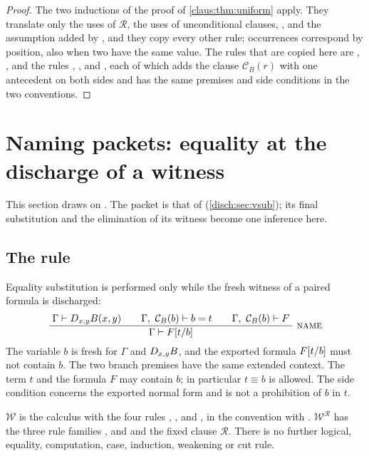 \begin{proof}
The two inductions of the proof of \cref{claus:thm:uniform} apply. They
translate only the uses of $\mathcal R$, the uses of unconditional
clauses, , and the assumption added by ,
and they copy every other rule; occurrences correspond by position, also
when two have the same value. The rules that are copied here are
, , and the rules ,
,  and , each of which adds
the clause $\mathcal C_B(r)$ with one antecedent on both sides and has the
same premises and side conditions in the two conventions.
\end{proof}

\section{Naming packets: equality at the discharge of a witness}
\label{disch:sec:name}

This section draws on . The packet is that of
 (\cref{disch:sec:vsub}); its final
substitution and the elimination of its witness become one inference here.

\subsection{The rule \texorpdfstring{}{Name}}

Equality substitution is performed only while the fresh witness of a
paired formula is discharged:
\begin{equation}
 \infrule{\Gamma\proves\D{x}{y}B(x,y)\qquad
          \Gamma,\ \mathcal C_B(b)\proves b=t\qquad
          \Gamma,\ \mathcal C_B(b)\proves F}
         {\Gamma\proves F\subst{t}{b}}\ \rulename{Name}
 \label{disch:eq:name}
\end{equation}
The variable $b$ is fresh for $\Gamma$ and $D_{x,y}B$, and the exported
formula $F[t/b]$ must not contain $b$. The two branch premises have
the same extended context. The term $t$ and the formula $F$ may contain
$b$; in particular $t\equiv b$ is allowed. The side condition concerns the
exported normal form and is not a prohibition of $b$ in $t$.

\begin{definition}
\label{disch:def:name}
$\mathcal W$ is the calculus with the four rules ,
,  and , in the convention
with . $\mathcal W^{\mathcal R}$ has the three rule families
,  and  and the fixed clause
$\mathcal R$. There is no further logical, equality, computation, case,
induction, weakening or cut rule.
\end{definition}

